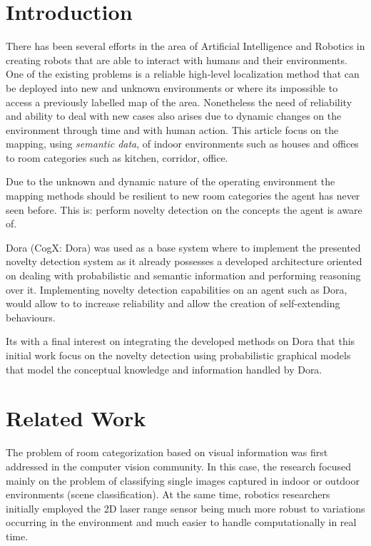 \documentclass[runningheads,a4paper]{llncs}
\begin{document}
\section{Introduction}
There has been several efforts in the area of Artificial Intelligence and Robotics
in creating robots that are able to interact with humans and their environments.
One of the existing problems is a reliable high-level localization method that can
be deployed into new and unknown environments or where its impossible to access a
previously labelled map of the area. Nonetheless the need of reliability and ability
to deal with new cases also arises due to dynamic changes on the environment through
time and with human action.
This article focus on the mapping, using \emph{semantic data}, of indoor
environments such as houses and offices to room categories such as kitchen,
corridor, office.

Due to the unknown and dynamic nature of the operating environment the
mapping methods should be resilient to new room categories the agent has never seen
before. This is: perform novelty detection on the concepts the agent is aware of.

Dora (CogX: Dora) was used as a base system where to implement the
presented novelty detection system as it already possesses a developed architecture
oriented on dealing with probabilistic and semantic information and performing
reasoning over it.
Implementing novelty detection capabilities on an agent such as Dora, would allow to
to increase reliability and allow the creation of self-extending behaviours.

Its with a final interest on integrating the developed methods on Dora that this
initial work focus on the novelty detection using probabilistic graphical models
that model the conceptual knowledge and information handled by Dora.


\section{Related Work}
The problem of room categorization based on visual information was first addressed
in the computer vision community. In this case, the research focused mainly on the
problem of classifying single images captured in indoor or outdoor environments
(scene classification). At the same time, robotics researchers initially employed
the 2D laser range sensor being much more robust to variations occurring in the
environment and much easier to handle computationally in real time.
\end{document}
